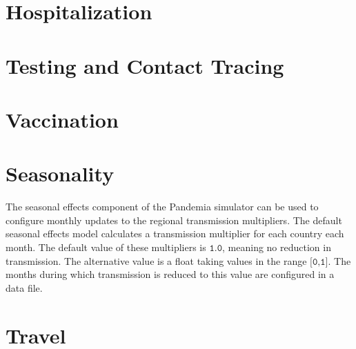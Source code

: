 \documentclass[10pt,letterpaper]{article}
\begin{document}
\section{Hospitalization}

\section{Testing and Contact Tracing}

\section{Vaccination}

\section{Seasonality}

The seasonal effects component of the Pandemia simulator can be used to configure monthly updates to the regional transmission multipliers. The default seasonal effects model calculates a transmission multiplier for each country each month. The default value of these multipliers is $\texttt{1.0}$, meaning no reduction in transmission. The alternative value is a float taking values in the range $\texttt{[0,1]}$. The months during which transmission is reduced to this value are configured in a data file.

\section{Travel}
\end{document}
